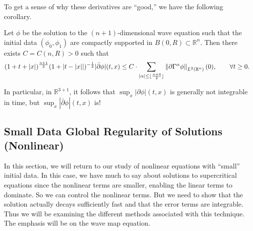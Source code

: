 \documentclass{article}
\begin{document}
To get a sense of why these derivatives are ``good,'' we have the following corollary. 

\begin{corollary}
	Let $\phi$ be the solution to the $(n + 1)$-dimensional wave equation such that the initial data $(\phi_{0}, \phi_{1})$ are compactly supported in $B(0,R) \subset \mathbb{R}^{n}$. Then there exists $C = C(n, R) > 0$ such that 
	\begin{equation*}
		(1 + t + |x|)^{\frac{n + 1}{2}}(1 + |t - |x||)^{-\frac{1}{2}}| \bar{\partial}\phi|(t,x) \leq C \cdot \sum_{|\alpha|\leq \lfloor \frac{n + 4}{2}\rfloor}\left\Vert \partial \Gamma^{\alpha}\phi \right\Vert_{L^{2}(\mathbb{R}^{n})}(0), \qquad \forall t\geq 0. 
	\end{equation*} 
\end{corollary} 
In particular, in $\mathbb{R}^{3 + 1}$, it follows that $\sup_{x}|\partial \phi|(t,x)$ is generally not integrable in time, but $\sup_{x}|\bar{\partial}\phi|(t,x)$ is!

\subsection{Small Data Global Regularity of Solutions (Nonlinear)}
In this section, we will return to our study of nonlinear equations with ``small'' initial data. In this case, we have much to say about solutions to supercritical equations since the nonlinear terms are smaller, enabling the linear terms to dominate. So we can control the nonlinear terms. But we need to show that the solution actually decays sufficiently fast and that the error terms are integrable. Thus we will be examining the different methods associated with this technique. The emphasis will be on the wave map equation. 
\end{document}

